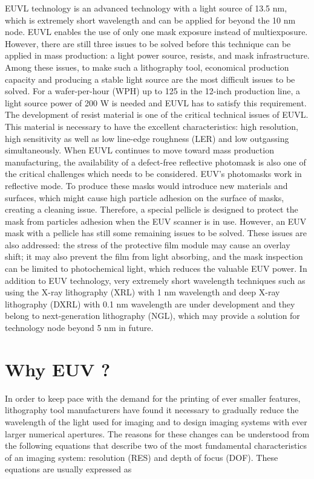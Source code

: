 \documentclass[12pt,a4paper]{report}
\begin{document}
EUVL technology is an advanced technology with a 
light source of 13.5 nm, which is extremely short 
wavelength and can be applied for beyond the 10 
nm node. EUVL enables the use of only one mask 
exposure instead of multiexposure. However, there 
are still three issues to be solved before this 
technique can be applied in mass production: a 
light power source, resists, and mask infrastructure. 
Among these issues, to make such a lithography tool, 
economical production capacity and producing a 
stable light source are the most difficult issues 
to be solved. For a wafer-per-hour (WPH) up to 125 
in the 12-inch production line, a light source 
power of 200 W is needed and EUVL has to satisfy 
this requirement.
The development of resist material is one of 
the critical technical issues of EUVL. This 
material is necessary to have the excellent 
characteristics: high resolution, high sensitivity 
as well as low line-edge roughness (LER) and low 
outgassing simultaneously.
When EUVL continues to move toward mass 
production manufacturing, the availability 
of a defect-free reflective photomask is also 
one of the critical challenges which needs to 
be considered. EUV's photomasks work in 
reflective mode. To produce these masks would 
introduce new materials and surfaces, which 
might cause high particle adhesion on the surface 
of masks, creating a cleaning issue. 
Therefore, a special pellicle is designed to 
protect the mask from particles adhesion when 
the EUV scanner is in use. However, an EUV mask 
with a pellicle has still some remaining issues 
to be solved. These issues are also addressed: 
the stress of the protective film module may 
cause an overlay shift; it may also prevent 
the film from light absorbing, and the mask 
inspection can be limited to photochemical light, 
which reduces the valuable EUV power.
In addition to EUV technology, very extremely 
short wavelength techniques such as using the 
X-ray lithography (XRL) with 1 nm wavelength 
 and deep X-ray lithography (DXRL) with 0.1 nm 
 wavelength are under development and they 
 belong to next-generation lithography (NGL), 
 which may provide a solution for technology 
 node beyond 5 nm in future.

\section{Why EUV ?}

In order to keep pace with the demand for the printing of
ever smaller features, lithography tool manufacturers
have found it necessary to gradually reduce the
wavelength of the light used for imaging and to design
imaging systems with ever larger numerical apertures.
The reasons for these changes can be understood from
the following equations that describe two of the most
fundamental characteristics of an imaging system:
resolution (RES) and depth of focus (DOF). These
equations are usually expressed as
\end{document}
